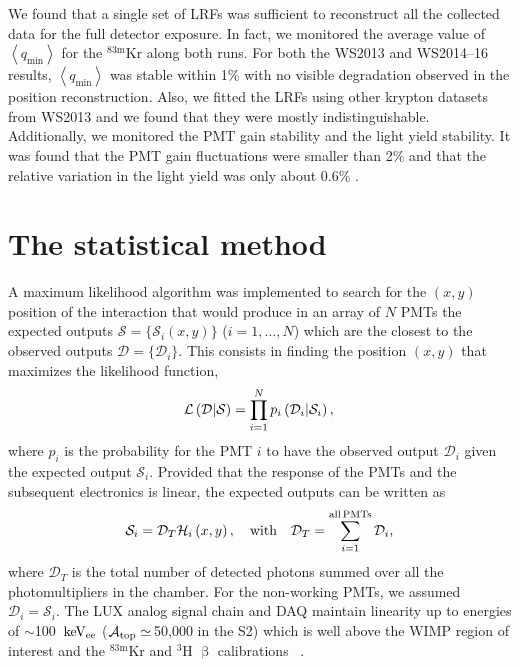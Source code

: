 \documentclass[a4paper,11pt]{article}
\begin{document}
We found that a single set of LRFs was sufficient to reconstruct all the collected data for the full detector exposure. In fact, we monitored the average value of $\left<q_{\mathrm{min}}\right>$ for the ${}^{\mathrm{83m}}$Kr along both runs. For both the WS2013 and WS2014--16 results, $\left<q_{\mathrm{min}}\right>$ was stable within 1\% with no visible degradation observed in the position reconstruction. Also, we fitted the LRFs using other krypton datasets from WS2013 and we found that they were mostly indistinguishable. Additionally, we monitored the PMT gain stability and the light yield stability.  It was found that the PMT gain fluctuations were smaller than 2\% and that the relative variation in the light yield was only about 0.6\% \cite{LUX2015_ReanalysisPRD}.

\section{The statistical method\label{section_the_minimization_method}}

A maximum likelihood algorithm \cite{Cowan1998, Macovski_1976} was implemented to search for the $(x, y)$ position of the interaction that would produce in an array of $N$ PMTs the expected outputs $\mathcal{S}=\{\mathcal{S}_i(x,y)\}$  ($i=1,...,N$) which are the closest to  the observed outputs $\mathcal{D}=\{\mathcal{D}_i\}$. This consists in finding the position $(x, y)$ that maximizes the   likelihood function,
\begin{equation}
\mathcal{L}\left( \mathcal{D}|\mathcal{S}  \right) = \prod_{i=1}^{N} p_i\left( \mathcal{D}_i|\mathcal{S}_i \right), \label{MLM_method}\\
\end{equation}
where $p_i$ is the probability for the PMT $i$ to have the observed output $\mathcal{D}_i$ given the expected output $\mathcal{S}_i$.  Provided that the response of the PMTs and the subsequent electronics is linear, the expected outputs can be written as 
\begin{equation}
\mathcal{S}_i = {\mathcal D}_T {\mathcal H}_i \left(x, y\right),\quad {\rm with} \quad {\mathcal D}_T = \sum_{i=1}^{\mathrm{all\,PMTs}} \mathcal{D}_i,\label{expected_outputs}
\end{equation}
where  ${{\mathcal D}}_T$ is the total number of detected photons summed over all the photomultipliers in the chamber. For the non-working PMTs, we assumed ${\mathcal D}_i={\mathcal S}_i$. The LUX analog signal chain and DAQ maintain linearity  up to energies of $\sim$100~$\rm keV_{ee}$ ($\mathcal{A}_{\rm top}\simeq$\,50,000 in the S2) which is well above the  WIMP region of interest and the $^{83\mathrm{m}}$Kr and ${}^{3}$H $\upbeta$ calibrations ~\cite{LUXDAQ2012}.
\end{document}
